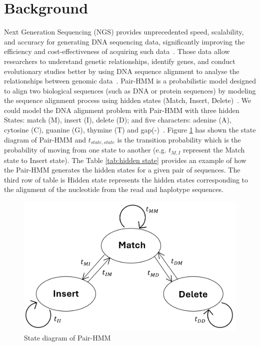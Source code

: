 \documentclass[PhD]{PHlab-thesis}
\begin{document}
\section{Background}
Next Generation Sequencing (NGS) provides unprecedented speed, scalability, and accuracy for generating DNA sequencing data, significantly improving the efficiency and cost-effectiveness of acquiring such data~\cite{NGS,NGS2}. Those data allow researchers to understand genetic relationships, identify genes, and conduct evolutionary studies better by using DNA sequence alignment to analyse the relationships between genomic data~\cite{NGS3,NGS4}. \newline
Pair-HMM is a probabilistic model designed to align two biological sequences (such as DNA or protein sequences) by modeling the sequence alignment process using hidden states (Match, Insert, Delete)~\cite{HMM,PHMM,RHMM}. We could model the DNA alignment problem with Pair-HMM with three hidden States: match (M), insert (I), delete (D); and five characters: adenine (A), cytosine (C), guanine (G), thymine (T) and gap(-)~\cite{EnliangLi}. Figure \ref{fig:state diagram} has shown the state diagram of Pair-HMM and \textit{$t_{state,state}$} is the transition probability which is the probability of moving from one state to another (e.g. \textit{$t_{M,I}$} represent the Match state to Insert state). The Table \ref{tab:hidden state} provides an example of how the Pair-HMM generates the hidden states for a given pair of sequences. The third row of table is Hidden state represents the hidden states corresponding to the alignment of the nucleotide from the read and haplotype sequences.
\begin{figure}[h]
    \centering
    \includegraphics[width=0.7\linewidth]{figure/state.png}
    \caption{State diagram of Pair-HMM}
    \label{fig:state diagram}
\end{figure}
\end{document}
